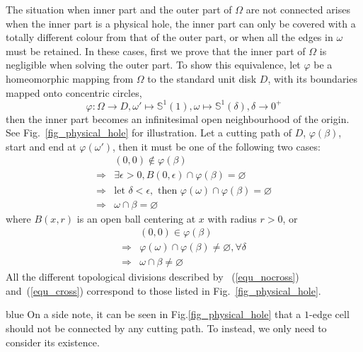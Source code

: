 \documentclass[Afour,sageh,times]{sagej}
\begin{document}
The situation when inner part and the outer part of $\Omega$ are not connected arises when the inner part is a physical hole, 
the inner part can only be covered with a totally different colour from that of the outer part, or when all the edges in $\omega$ must be retained. 
In these cases, first we prove that the inner part of $\Omega$ is negligible when solving the outer part. 
To show this equivalence, let $\varphi$ be a homeomorphic mapping 
from $\Omega$ to the standard unit disk $D$, with its boundaries mapped onto concentric circles, 
\begin{equation}
\varphi: \Omega\rightarrow D, \omega'\mapsto \mathbb{S}^1(1), \omega\mapsto \mathbb{S}^1(\delta), \delta\rightarrow 0^+
\end{equation}
then the inner part becomes an infinitesimal open neighbourhood of the origin. See Fig.~\ref{fig_physical_hole} for illustration. 
Let a cutting path of $D$, $\varphi(\beta)$, start and end at $\varphi(\omega')$, then it must be one of the following two cases:
\begin{equation}
\label{equ_nocross}
\begin{aligned}
&(0, 0)\notin \varphi(\beta)\\
\Rightarrow &\exists \epsilon > 0, B(0, \epsilon) \cap \varphi(\beta) = \varnothing\\
\Rightarrow &\mbox{let } \delta < \epsilon, \mbox{ then } \varphi(\omega)\cap \varphi(\beta) = \varnothing\\
\Rightarrow & \omega\cap \beta = \varnothing
\end{aligned}
\end{equation}
where $B(x, r)$ is an open ball centering at $x$ with radius $r>0$, or 
\begin{equation}
\label{equ_cross}
\begin{aligned}
&(0, 0)\in \varphi(\beta)\\
\Rightarrow &\varphi(\omega)\cap \varphi(\beta) \neq \varnothing, \forall \delta\\
\Rightarrow & \omega\cap \beta \neq \varnothing
\end{aligned}
\end{equation}
All the different topological divisions described by ~(\ref{equ_nocross}) and~(\ref{equ_cross}) correspond to those listed in Fig.~\ref{fig_physical_hole}.
\begin{color}{blue}
On a side note, it can be seen in Fig.\ref{fig_physical_hole} that a $1$-edge cell should not be connected by any cutting path. To instead, we only need to consider its existence. 
\end{color}
 
\end{document}
